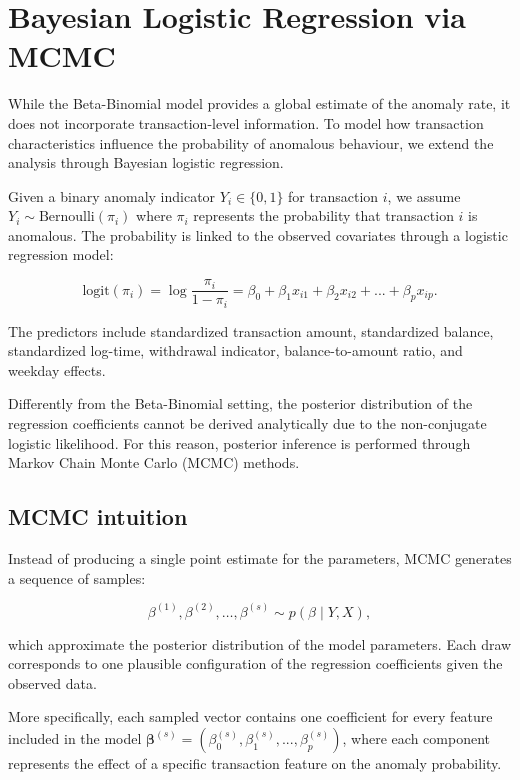 \documentclass[a4paper,12pt]{article}
\begin{document}
\section{Bayesian Logistic Regression via MCMC}

While the Beta-Binomial model provides a global estimate of the anomaly rate, it does not incorporate transaction-level information. To model how transaction characteristics influence the probability of anomalous behaviour, we extend the analysis through Bayesian logistic regression.

Given a binary anomaly indicator $Y_i \in \{0,1\}$ for transaction $i$, we assume $Y_i \sim \text{Bernoulli}(\pi_i)$ where $\pi_i$ represents the probability that transaction $i$ is anomalous. The probability is linked to the observed covariates through a logistic regression model:

\[
\text{logit}(\pi_i) = \log \frac{\pi_i}{1 - \pi_i}
=
\beta_0+\beta_1 x_{i1}+\beta_2 x_{i2}+... + \beta_p x_{ip}.
\]

The predictors include standardized transaction amount, standardized balance, standardized log-time, withdrawal indicator, balance-to-amount ratio, and weekday effects.

Differently from the Beta-Binomial setting, the posterior distribution of the regression coefficients cannot be derived analytically due to the non-conjugate logistic likelihood. For this reason, posterior inference is performed through Markov Chain Monte Carlo (MCMC) methods.

\subsection{MCMC intuition}

Instead of producing a single point estimate for the parameters, MCMC generates a sequence of samples:

\[
\beta^{(1)}, \beta^{(2)}, \dots, \beta^{(s)}
\sim
p(\beta \mid Y,X),
\]

which approximate the posterior distribution of the model parameters. Each draw corresponds to one plausible configuration of the regression coefficients given the observed data.

More specifically, each sampled vector contains one coefficient for every feature included in the model $\bm\beta^{(s)}=\left(\beta_0^{(s)},\beta_1^{(s)},...,\beta_p^{(s)}\right)$, where each component represents the effect of a specific transaction feature on the anomaly probability.
\end{document}
